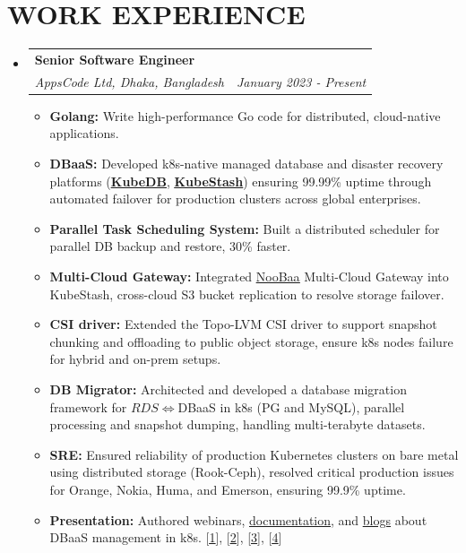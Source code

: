 \documentclass[letterpaper,11pt]{article}
\makeatletter
\newcommand{\resumeItem}[1]{
  \item\small{
    {#1 \vspace{-1pt}}
  }
}
\newcommand{\resumeSubheading}[4]{
  \vspace{-2pt}\item
    \begin{tabular*}{1.0\textwidth}[t]{l@{\extracolsep{\fill}}r}
      \textbf{\large#1} & \textbf{\small #2} \\
      \textit{\large#3} & \textit{\small #4} \\
    \end{tabular*}\vspace{-7pt}
}
\newcommand{\resumeSubHeadingListStart}{\begin{itemize}[leftmargin=0.0in, label={}]}
\newcommand{\resumeSubHeadingListEnd}{\end{itemize}}
\newcommand{\resumeItemListStart}{\begin{itemize}[leftmargin=0.1in]}
\newcommand{\resumeItemListEnd}{\end{itemize}\vspace{-5pt}}
\makeatother
\begin{document}
\section{\color{airforceblue}WORK EXPERIENCE}
  \resumeSubHeadingListStart
    \resumeSubheading
      {Senior Software Engineer}{} 
      {AppsCode Ltd, Dhaka, Bangladesh}{January 2023 - Present}
      \resumeItemListStart
            \resumeItem{\normalsize{\textbf{Golang:} Write high-performance Go code for distributed, cloud-native applications.}}
            \resumeItem{\normalsize{\textbf{DBaaS:} Developed k8s-native managed database and disaster recovery platforms (\href{https://kubedb.com}{\underline{\textbf{KubeDB}}}, \href{https://kubestash.com}{\underline{\textbf{KubeStash}}}) ensuring 99.99\% uptime through automated failover for production clusters across global enterprises.}}  
            \resumeItem{\normalsize{\textbf{Parallel Task Scheduling System:} Built a distributed scheduler for parallel DB backup and restore, 30\% faster.}} 
            \resumeItem{\normalsize{\textbf{Multi-Cloud Gateway:} Integrated \href{https://github.com/kubeobj/noobaa-operator}{\underline{NooBaa}} Multi-Cloud Gateway into KubeStash, cross-cloud S3 bucket replication to resolve storage failover.}}
            \resumeItem{\normalsize{\textbf{CSI driver:} Extended the Topo-LVM CSI driver to support snapshot chunking and offloading to public object storage, ensure k8s nodes failure for hybrid and on-prem setups.}}
            \resumeItem{\normalsize{\textbf{DB Migrator:} Architected and developed a database migration framework for $RDS\Leftrightarrow$DBaaS in k8s (PG and MySQL), parallel processing and snapshot dumping, handling multi-terabyte datasets.}}
            \resumeItem{\normalsize{\textbf{SRE:} Ensured reliability of production Kubernetes clusters on bare metal using distributed storage (Rook-Ceph), resolved critical production issues for Orange, Nokia, Huma, and Emerson, ensuring 99.9\% uptime.}}
            \resumeItem{\normalsize{\textbf{Presentation:} Authored webinars, \href{https://kubestash.com/docs/latest/guides/}{\underline{documentation}}, and \href{https://appscode.com/blog/authors/md-anisur-rahman/}{\underline{blogs}} about DBaaS management in k8s. [\href{https://www.youtube.com/watch?v=Yr4XDvKTjZg}{\underline{1}}], [\href{https://www.youtube.com/watch?v=qrZ2q23HpF4}{\underline{2}}], [\href{https://www.youtube.com/watch?v=mq8DqU5C-vI}{\underline{3}}], [\href{https://www.youtube.com/live/WJnfedPx-BA}{\underline{4}}]}}
      \resumeItemListEnd  
  \resumeSubHeadingListEnd
\vspace{-12pt}
\end{document}

